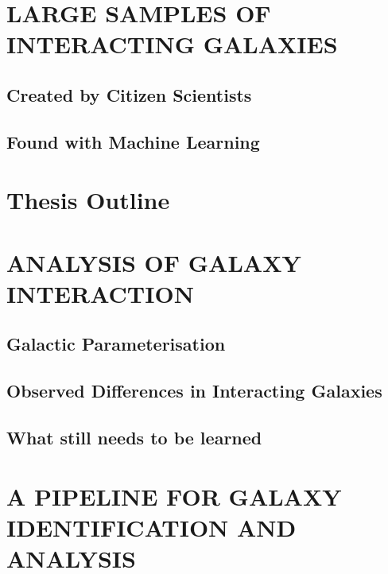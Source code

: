 \section{LARGE SAMPLES OF INTERACTING GALAXIES}
\subsection{Created by Citizen Scientists}
\subsection{Found with Machine Learning}
\section{Thesis Outline}

\section{ANALYSIS OF GALAXY INTERACTION}
\subsection{Galactic Parameterisation}
\subsection{Observed Differences in Interacting Galaxies}
\subsection{What still needs to be learned}

\section{A PIPELINE FOR GALAXY IDENTIFICATION AND ANALYSIS}